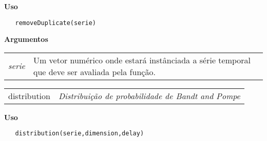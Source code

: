 \documentclass[12pt,letterpaper]{article}
\begin{document}
\vspace{-0.5cm}

\hrulefill  

\vspace{0.5cm}

\textbf{Uso}

\begin{lstlisting}
   removeDuplicate(serie)
\end{lstlisting}

\vspace{0.5cm}

\textbf{Argumentos}

\begin{table}[!h]
\begin{center}
\begin{tabularx}{\textwidth}{X X}
\hspace{0.5cm} \textit{serie} & Um vetor numérico onde estará instânciada a série temporal que deve ser avaliada pela função.\\
\end{tabularx}
\end{center}
\end{table} 


\hrulefill   

\begin{table}[!h]
\begin{center}
\begin{tabularx}{\textwidth}{X X}
\hspace{0.5cm} distribution & \textit{Distribuição de probabilidade de Bandt and Pompe}\\
\end{tabularx}
\end{center}
\end{table} 

\vspace{-0.5cm}

\hrulefill  

\vspace{0.5cm}

\textbf{Uso}

\begin{lstlisting}
   distribution(serie,dimension,delay)
\end{lstlisting}

\vspace{0.5cm}
\end{document}
